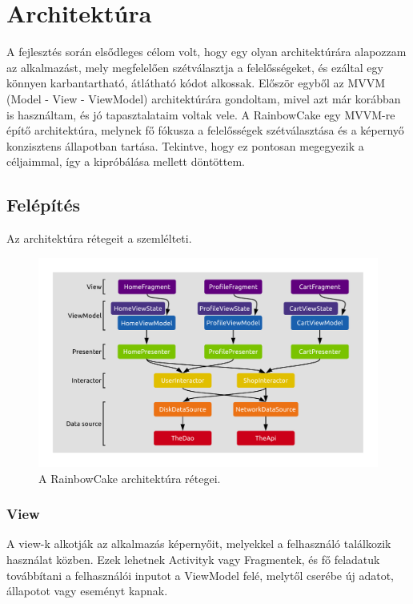 \chapter{Architektúra}

A fejlesztés során elsődleges célom volt, hogy egy olyan architektúrára alapozzam az alkalmazást, mely megfelelően szétválasztja a felelősségeket, és ezáltal egy könnyen karbantartható, átlátható kódot alkossak. Először egyből az MVVM (Model - View - ViewModel) architektúrára gondoltam, mivel azt már korábban is használtam, és jó tapasztalataim voltak vele. A RainbowCake\cite{Rainbowcake} egy MVVM-re építő architektúra, melynek fő fókusza a felelősségek szétválasztása és a képernyő konzisztens állapotban tartása. Tekintve, hogy ez pontosan megegyezik a céljaimmal, így a kipróbálása mellett döntöttem.

\section{Felépítés}

Az architektúra rétegeit a  szemlélteti.

\begin{figure}[!ht]
	\centering
	\includegraphics[width=150mm, keepaspectratio]{figures/final-architecture.png}
	\caption{A RainbowCake architektúra rétegei.}
	\label{fig:RainbowCakeLayers}
\end{figure}

\subsection{View}
A view-k alkotják az alkalmazás képernyőit, melyekkel a felhasználó találkozik használat közben. Ezek lehetnek Activityk vagy Fragmentek, és fő feladatuk továbbítani a felhasználói inputot a ViewModel felé, melytől cserébe új adatot, állapotot vagy eseményt kapnak. 

